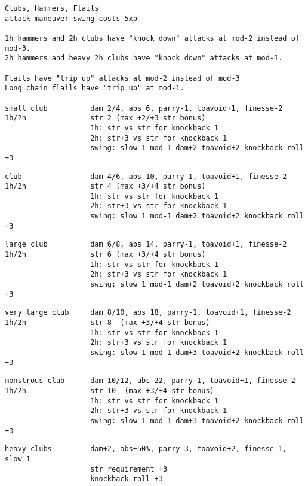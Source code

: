 \goodbreak \small \begin{samepage} \begin{verbatim}
Clubs, Hammers, Flails
attack maneuver swing costs 5xp

1h hammers and 2h clubs have "knock down" attacks at mod-2 instead of mod-3.
2h hammers and heavy 2h clubs have "knock down" attacks at mod-1.

Flails have "trip up" attacks at mod-2 instead of mod-3
Long chain flails have "trip up" at mod-1.

small club          dam 2/4, abs 6, parry-1, toavoid+1, finesse-2
1h/2h               str 2 (max +2/+3 str bonus)
                    1h: str vs str for knockback 1
                    2h: str+3 vs str for knockback 1
                    swing: slow 1 mod-1 dam+2 toavoid+2 knockback roll +3
\end{verbatim} \blocklistgap \begin{verbatim}
club                dam 4/6, abs 10, parry-1, toavoid+1, finesse-2
1h/2h               str 4 (max +3/+4 str bonus)
                    1h: str vs str for knockback 1
                    2h: str+3 vs str for knockback 1
                    swing: slow 1 mod-1 dam+2 toavoid+2 knockback roll +3
\end{verbatim} \blocklistgap \begin{verbatim}
large club          dam 6/8, abs 14, parry-1, toavoid+1, finesse-2
1h/2h               str 6 (max +3/+4 str bonus)
                    1h: str vs str for knockback 1
                    2h: str+3 vs str for knockback 1
                    swing: slow 1 mod-1 dam+2 toavoid+2 knockback roll +3
\end{verbatim} \blocklistgap \begin{verbatim}
very large club     dam 8/10, abs 18, parry-1, toavoid+1, finesse-2
1h/2h               str 8  (max +3/+4 str bonus)
                    1h: str vs str for knockback 1
                    2h: str+3 vs str for knockback 1
                    swing: slow 1 mod-1 dam+3 toavoid+2 knockback roll +3
\end{verbatim} \blocklistgap \begin{verbatim}
monstrous club      dam 10/12, abs 22, parry-1, toavoid+1, finesse-2
1h/2h               str 10  (max +3/+4 str bonus)
                    1h: str vs str for knockback 1
                    2h: str+3 vs str for knockback 1
                    swing: slow 1 mod-1 dam+3 toavoid+2 knockback roll +3
\end{verbatim} \blocklistgap \begin{verbatim}
heavy clubs         dam+2, abs+50%, parry-3, toavoid+2, finesse-1, slow 1
                    str requirement +3
                    knockback roll +3
\end{verbatim} \end{samepage} \normalsize \goodbreak

